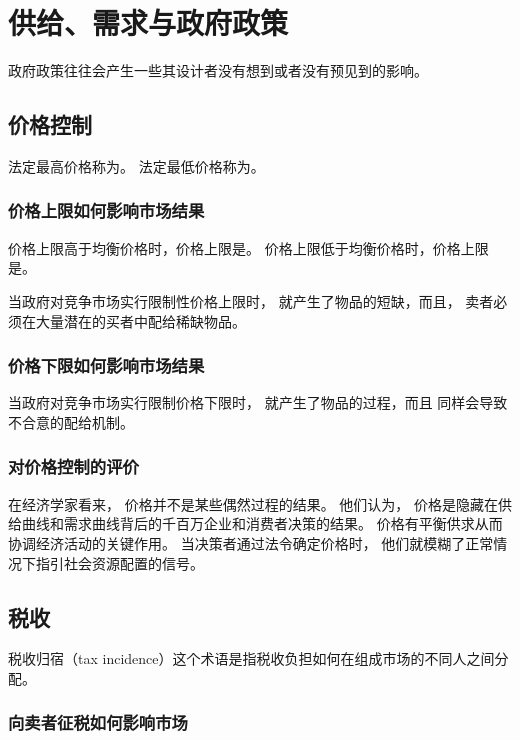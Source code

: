 
\chapter{供给、需求与政府政策}

政府政策往往会产生一些其设计者没有想到或者没有预见到的影响。

\section{价格控制}

法定最高价格称为。
法定最低价格称为。


\subsection{价格上限如何影响市场结果}

价格上限高于均衡价格时，价格上限是。
价格上限低于均衡价格时，价格上限是。

当政府对竞争市场实行限制性价格上限时，
就产生了物品的短缺，而且，
卖者必须在大量潜在的买者中配给稀缺物品。


\subsection{价格下限如何影响市场结果}
当政府对竞争市场实行限制价格下限时，
就产生了物品的过程，而且
同样会导致不合意的配给机制。


\subsection{对价格控制的评价}

在经济学家看来，
价格并不是某些偶然过程的结果。
他们认为，
价格是隐藏在供给曲线和需求曲线背后的千百万企业和消费者决策的结果。
价格有平衡供求从而协调经济活动的关键作用。
当决策者通过法令确定价格时，
他们就模糊了正常情况下指引社会资源配置的信号。


\section{税收}


税收归宿（tax incidence）这个术语是指税收负担如何在组成市场的不同人之间分配。


\subsection{向卖者征税如何影响市场}

